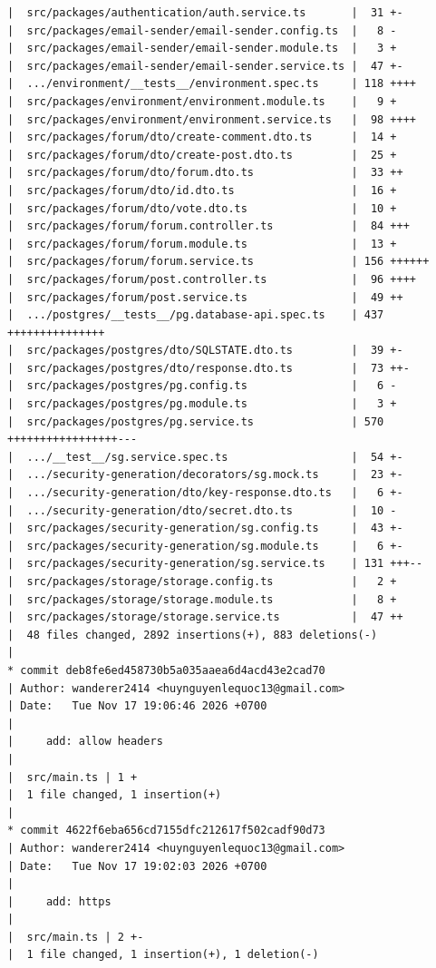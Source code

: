 \documentclass[12pt]{article}
\begin{document}
\begin{lstlisting}[numbers=none,breaklines=true]
|  src/packages/authentication/auth.service.ts       |  31 +-
|  src/packages/email-sender/email-sender.config.ts  |   8 -
|  src/packages/email-sender/email-sender.module.ts  |   3 +
|  src/packages/email-sender/email-sender.service.ts |  47 +-
|  .../environment/__tests__/environment.spec.ts     | 118 ++++
|  src/packages/environment/environment.module.ts    |   9 +
|  src/packages/environment/environment.service.ts   |  98 ++++
|  src/packages/forum/dto/create-comment.dto.ts      |  14 +
|  src/packages/forum/dto/create-post.dto.ts         |  25 +
|  src/packages/forum/dto/forum.dto.ts               |  33 ++
|  src/packages/forum/dto/id.dto.ts                  |  16 +
|  src/packages/forum/dto/vote.dto.ts                |  10 +
|  src/packages/forum/forum.controller.ts            |  84 +++
|  src/packages/forum/forum.module.ts                |  13 +
|  src/packages/forum/forum.service.ts               | 156 ++++++
|  src/packages/forum/post.controller.ts             |  96 ++++
|  src/packages/forum/post.service.ts                |  49 ++
|  .../postgres/__tests__/pg.database-api.spec.ts    | 437 +++++++++++++++
|  src/packages/postgres/dto/SQLSTATE.dto.ts         |  39 +-
|  src/packages/postgres/dto/response.dto.ts         |  73 ++-
|  src/packages/postgres/pg.config.ts                |   6 -
|  src/packages/postgres/pg.module.ts                |   3 +
|  src/packages/postgres/pg.service.ts               | 570 +++++++++++++++++---
|  .../__test__/sg.service.spec.ts                   |  54 +-
|  .../security-generation/decorators/sg.mock.ts     |  23 +-
|  .../security-generation/dto/key-response.dto.ts   |   6 +-
|  .../security-generation/dto/secret.dto.ts         |  10 -
|  src/packages/security-generation/sg.config.ts     |  43 +-
|  src/packages/security-generation/sg.module.ts     |   6 +-
|  src/packages/security-generation/sg.service.ts    | 131 +++--
|  src/packages/storage/storage.config.ts            |   2 +
|  src/packages/storage/storage.module.ts            |   8 +
|  src/packages/storage/storage.service.ts           |  47 ++
|  48 files changed, 2892 insertions(+), 883 deletions(-)
|
* commit deb8fe6ed458730b5a035aaea6d4acd43e2cad70
| Author: wanderer2414 <huynguyenlequoc13@gmail.com>
| Date:   Tue Nov 17 19:06:46 2026 +0700
|
|     add: allow headers
|
|  src/main.ts | 1 +
|  1 file changed, 1 insertion(+)
|
* commit 4622f6eba656cd7155dfc212617f502cadf90d73
| Author: wanderer2414 <huynguyenlequoc13@gmail.com>
| Date:   Tue Nov 17 19:02:03 2026 +0700
|
|     add: https
|
|  src/main.ts | 2 +-
|  1 file changed, 1 insertion(+), 1 deletion(-)

\end{lstlisting}
\end{document}
